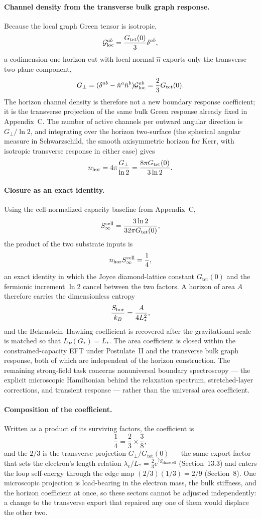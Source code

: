 \documentclass[11pt]{article}
\begin{document}
\paragraph{Channel density from the transverse bulk graph response.}
Because the local graph Green tensor is isotropic,
\[
{\cal G}_{\rm loc}^{ab}=\frac{G_{\mathrm{tet}}(0)}{3}\delta^{ab},
\]
a codimension-one horizon cut with local normal $\hat n$ exports only the transverse two-plane component,
\[
G_\perp=(\delta^{ab}-\hat n^a\hat n^b){\cal G}_{\rm loc}^{ab}=\frac23G_{\mathrm{tet}}(0).
\]
The horizon channel density is therefore not a new boundary response coefficient; it is the transverse projection of the same bulk Green response already fixed in Appendix~C. The number of active channels per outward angular direction is $G_\perp/\ln 2$, and integrating over the horizon two-surface (the spherical angular measure in Schwarzschild, the smooth axisymmetric horizon for Kerr, with isotropic transverse response in either case) gives
\[
n_{\rm hor}=4\pi\frac{G_\perp}{\ln 2}=\frac{8\pi G_{\mathrm{tet}}(0)}{3\ln 2}.
\]

\paragraph{Closure as an exact identity.}
Using the cell-normalized capacity baseline from Appendix~C,
\[
S_\infty^{\rm cell}=\frac{3\ln 2}{32\pi G_{\mathrm{tet}}(0)},
\]
the product of the two substrate inputs is
\[
n_{\rm hor}S_\infty^{\rm cell}=\frac14,
\]
an exact identity in which the Joyce diamond-lattice constant $G_{\mathrm{tet}}(0)$ and the fermionic increment $\ln 2$ cancel between the two factors. A horizon of area $A$ therefore carries the dimensionless entropy
\[
\frac{S_{\rm hor}}{k_B}=\frac{A}{4L_*^2},
\]
and the Bekenstein--Hawking coefficient is recovered after the gravitational scale is matched so that $L_P(G_*)=L_*$. The area coefficient is closed within the constrained-capacity EFT under Postulate~II and the transverse bulk graph response, both of which are independent of the horizon construction. The remaining strong-field task concerns nonuniversal boundary spectroscopy --- the explicit microscopic Hamiltonian behind the relaxation spectrum, stretched-layer corrections, and transient response --- rather than the universal area coefficient.

\paragraph{Composition of the coefficient.}
Written as a product of its surviving factors, the coefficient is
\[
\frac14=\frac23\times\frac38,
\]
and the $2/3$ is the transverse projection $G_\perp/G_{\mathrm{tet}}(0)$ --- the same export factor that sets the electron's length relation $\lambda_e/L_*=\tfrac23e^{7g_{\mathrm{share,eff}}}$ (Section~13.3) and enters the loop self-energy through the edge map $(2/3)(1/3)=2/9$ (Section~8). One microscopic projection is load-bearing in the electron mass, the bulk stiffness, and the horizon coefficient at once, so these sectors cannot be adjusted independently: a change to the transverse export that repaired any one of them would displace the other two.
\end{document}
